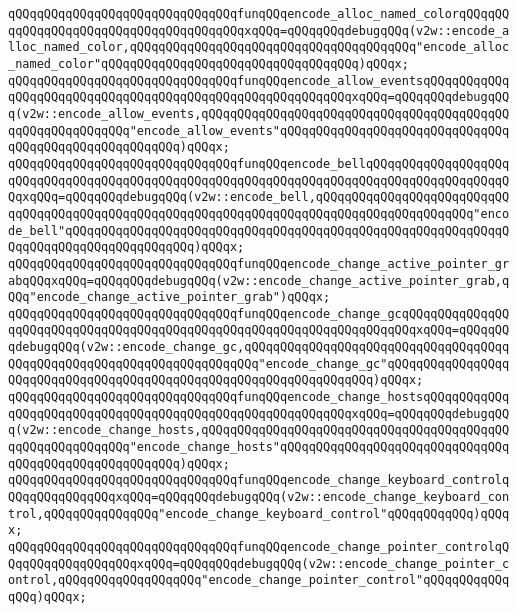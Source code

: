 \verb|qQQqqQQqqQQqqQQqqQQqqQQqqQQqqQQqfunqQQqencode_alloc_named_colorqQQqqQQqqQQqqQQqqQQqqQQqqQQqqQQqqQQqqQQqxqQQq=qQQqqQQqdebugqQQq(v2w::encode_alloc_named_color,qQQqqQQqqQQqqQQqqQQqqQQqqQQqqQQqqQQqqQQq"encode_alloc_named_color"qQQqqQQqqQQqqQQqqQQqqQQqqQQqqQQqqQQq)qQQqx;|\newline
\verb|qQQqqQQqqQQqqQQqqQQqqQQqqQQqqQQqfunqQQqencode_allow_eventsqQQqqQQqqQQqqQQqqQQqqQQqqQQqqQQqqQQqqQQqqQQqqQQqqQQqqQQqqQQqxqQQq=qQQqqQQqdebugqQQq(v2w::encode_allow_events,qQQqqQQqqQQqqQQqqQQqqQQqqQQqqQQqqQQqqQQqqQQqqQQqqQQqqQQqqQQq"encode_allow_events"qQQqqQQqqQQqqQQqqQQqqQQqqQQqqQQqqQQqqQQqqQQqqQQqqQQqqQQq)qQQqx;|\newline
\verb|qQQqqQQqqQQqqQQqqQQqqQQqqQQqqQQqfunqQQqencode_bellqQQqqQQqqQQqqQQqqQQqqQQqqQQqqQQqqQQqqQQqqQQqqQQqqQQqqQQqqQQqqQQqqQQqqQQqqQQqqQQqqQQqqQQqqQQqxqQQq=qQQqqQQqdebugqQQq(v2w::encode_bell,qQQqqQQqqQQqqQQqqQQqqQQqqQQqqQQqqQQqqQQqqQQqqQQqqQQqqQQqqQQqqQQqqQQqqQQqqQQqqQQqqQQqqQQqqQQq"encode_bell"qQQqqQQqqQQqqQQqqQQqqQQqqQQqqQQqqQQqqQQqqQQqqQQqqQQqqQQqqQQqqQQqqQQqqQQqqQQqqQQqqQQqqQQq)qQQqx;|\newline
\verb|qQQqqQQqqQQqqQQqqQQqqQQqqQQqqQQqfunqQQqencode_change_active_pointer_grabqQQqxqQQq=qQQqqQQqdebugqQQq(v2w::encode_change_active_pointer_grab,qQQq"encode_change_active_pointer_grab")qQQqx;|\newline
\verb|qQQqqQQqqQQqqQQqqQQqqQQqqQQqqQQqfunqQQqencode_change_gcqQQqqQQqqQQqqQQqqQQqqQQqqQQqqQQqqQQqqQQqqQQqqQQqqQQqqQQqqQQqqQQqqQQqqQQqxqQQq=qQQqqQQqdebugqQQq(v2w::encode_change_gc,qQQqqQQqqQQqqQQqqQQqqQQqqQQqqQQqqQQqqQQqqQQqqQQqqQQqqQQqqQQqqQQqqQQqqQQq"encode_change_gc"qQQqqQQqqQQqqQQqqQQqqQQqqQQqqQQqqQQqqQQqqQQqqQQqqQQqqQQqqQQqqQQqqQQq)qQQqx;|\newline
\verb|qQQqqQQqqQQqqQQqqQQqqQQqqQQqqQQqfunqQQqencode_change_hostsqQQqqQQqqQQqqQQqqQQqqQQqqQQqqQQqqQQqqQQqqQQqqQQqqQQqqQQqqQQqxqQQq=qQQqqQQqdebugqQQq(v2w::encode_change_hosts,qQQqqQQqqQQqqQQqqQQqqQQqqQQqqQQqqQQqqQQqqQQqqQQqqQQqqQQqqQQq"encode_change_hosts"qQQqqQQqqQQqqQQqqQQqqQQqqQQqqQQqqQQqqQQqqQQqqQQqqQQqqQQq)qQQqx;|\newline
\verb|qQQqqQQqqQQqqQQqqQQqqQQqqQQqqQQqfunqQQqencode_change_keyboard_controlqQQqqQQqqQQqqQQqxqQQq=qQQqqQQqdebugqQQq(v2w::encode_change_keyboard_control,qQQqqQQqqQQqqQQq"encode_change_keyboard_control"qQQqqQQqqQQq)qQQqx;|\newline
\verb|qQQqqQQqqQQqqQQqqQQqqQQqqQQqqQQqfunqQQqencode_change_pointer_controlqQQqqQQqqQQqqQQqqQQqxqQQq=qQQqqQQqdebugqQQq(v2w::encode_change_pointer_control,qQQqqQQqqQQqqQQqqQQq"encode_change_pointer_control"qQQqqQQqqQQqqQQq)qQQqx;|\newline
